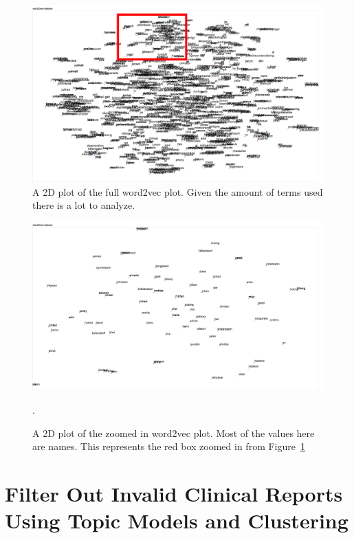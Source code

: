 \begin{figure}
    \centering
    \includegraphics[scale=0.25]{figures/word2vec-overview.png}
    \caption{A 2D plot of the full word2vec plot. Given the amount of terms used there is a lot to analyze.}
    \label{fig:word2vec-overview}
\end{figure}

\begin{figure}
    \centering
    \includegraphics[scale=0.25]{figures/word2vec-names.png}
    \caption{A 2D plot of the zoomed in word2vec plot. Most of the values here are names. This represents the red box zoomed in from Figure~\ref{fig:word2vec-overview}}.
    \label{fig:word2vec-names}
\end{figure}

\section{Filter Out Invalid Clinical Reports Using Topic Models and Clustering}\label{sec:exp1-result}


